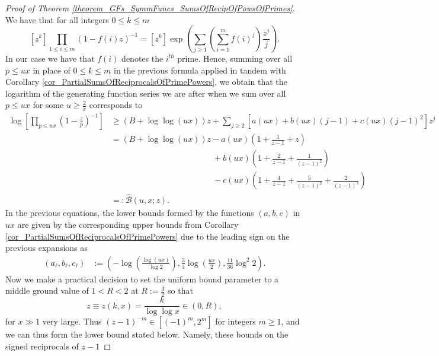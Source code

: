 \documentclass[11pt,reqno,a4letter]{article}
\numberwithin{figure}{section}
\numberwithin{table}{section}
\theoremstyle{plain}
\numberwithin{theorem}{section}
\theoremstyle{definition}
\newcommand{\NBRef}[1]{
     \todo[linecolor=green!85!white,backgroundcolor=orange!50!white,bordercolor=blue!30!black,textcolor=cyan!15!black,shadow,size=\small,fancyline]{
     \color{NBRefColor}{\textbf{#1}
     }
     }
}
\begin{document}
\NBRef{A06-2020-04-26} 
\begin{proof}[Proof of Theorem \ref{theorem_GFs_SymmFuncs_SumsOfRecipOfPowsOfPrimes}] 
We have that for all integers $0 \leq k \leq m$
\begin{equation} 
\label{eqn_pf_tag_hSymmPolysGF} 
[z^k] \prod_{1 \leq i \leq m} (1-f(i) z)^{-1} = [z^k] \exp\left(\sum_{j \geq 1} 
     \left(\sum_{i=1}^m f(i)^j\right) \frac{z^j}{j}\right). 
\end{equation} 
In our case we have that $f(i)$ denotes the $i^{th}$ prime. 
Hence, summing over all $p \leq ux$ 
in place of $0 \leq k \leq m$ in the previous formula applied in tandem with 
Corollary \ref{cor_PartialSumsOfReciprocalsOfPrimePowers}, we obtain that the logarithm of the 
generating function series we are after when we sum over all $p \leq ux$ for some 
$u \geq \frac{2}{x}$ corresponds to 
\begin{align*} 
\log\left[\prod_{p \leq ux} \left(1-\frac{z}{p}\right)^{-1}\right] & \geq (B + \log\log (ux)) z + 
     \sum_{j \geq 2} \left[a(ux) + b(ux)(j-1) + c(ux) (j-1)^2\right] z^j \\ 
     & = (B + \log\log (ux)) z - a(ux) \left(1 + \frac{1}{z-1} + z\right) \\ 
     & \phantom{= (B + \log\log (ux)) z\ } + 
     b(ux) \left( 
     1 + \frac{2}{z-1} + \frac{1}{(z-1)^2}\right) \\ 
     & \phantom{= (B + \log\log (ux)) z\ } - 
     c(ux) \left( 
     1 + \frac{4}{z-1} + \frac{5}{(z-1)^2} + \frac{2}{(z-1)^3}\right) \\ 
     & =: \widehat{\mathcal{B}}(u, x; z). 
\end{align*} 
In the previous equations, the lower bounds formed by the functions $(a,b,c)$ in $ux$ are 
given by the corresponding upper bounds from 
Corollary \ref{cor_PartialSumsOfReciprocalsOfPrimePowers} 
due to the leading sign on the previous expansions as 
\begin{align*} 
(a_{\ell}, b_{\ell}, c_{\ell}) & := \left(-\log\left(\frac{\log (ux)}{\log 2}\right), 
     \frac{3}{4} \log\left(\frac{ux}{2}\right), \frac{11}{36} \log^2 2\right). 
\end{align*} 
Now we make a practical decision to set the uniform bound parameter to a middle ground value of 
$1 < R < 2$ at $R := \frac{3}{2}$ so that 
$$z \equiv z(k, x) = \frac{k}{\log\log x} \in (0, R),$$ for $x \gg 1$ very large. 
Thus $(z-1)^{-m} \in [(-1)^m, 2^m]$ for integers $m \geq 1$, and we can thus form the 
lower bound stated below. Namely, these bounds on the signed reciprocals of $z-1$ 

\end{proof}
\end{document}
